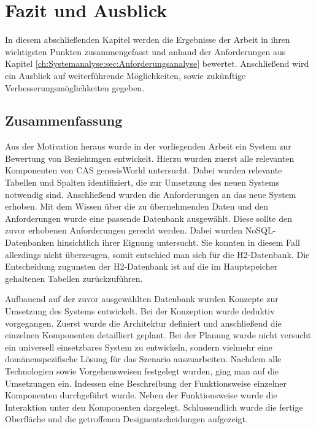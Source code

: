 
\chapter{Fazit und Ausblick}
\label{ch:Ergebnis}

In diesem abschließenden Kapitel werden die Ergebnisse der Arbeit in ihren wichtigsten Punkten zusammengefasst und anhand der Anforderungen aus Kapitel \ref{ch:Systemanalyse:sec:Anforderungsanalyse} bewertet. Anschließend wird ein Ausblick auf weiterführende Möglichkeiten, sowie zukünftige Verbesserungsmöglichkeiten gegeben. 

\section{Zusammenfassung}
\label{ch:Ergebnis:sec:zusammenfassung}

Aus der Motivation heraus wurde in der vorliegenden Arbeit ein System zur Bewertung von Beziehungen entwickelt. Hierzu wurden zuerst alle relevanten Komponenten von CAS genesisWorld untersucht. Dabei wurden relevante Tabellen und Spalten identifiziert, die zur Umsetzung des neuen Systems notwendig sind. Anschließend wurden die Anforderungen an das neue System erhoben. Mit dem Wissen über die zu übernehmenden Daten und den Anforderungen wurde eine passende Datenbank ausgewählt. Diese sollte den zuvor erhobenen Anforderungen gerecht werden. Dabei wurden NoSQL-Datenbanken hinsichtlich ihrer Eignung untersucht. Sie konnten in diesem Fall allerdings nicht überzeugen, somit entschied man sich für die H2-Datenbank. Die Entscheidung zugunsten der H2-Datenbank ist auf die im Hauptspeicher gehaltenen Tabellen zurückzuführen.   

Aufbauend auf der zuvor ausgewählten Datenbank wurden Konzepte zur Umsetzung des Systems entwickelt. Bei der Konzeption wurde deduktiv vorgegangen. Zuerst wurde die Architektur definiert und anschließend die einzelnen Komponenten detailliert geplant. Bei der Planung wurde nicht versucht ein universell einsetzbares System zu entwickeln, sondern vielmehr eine domänenspezifische Lösung für das Szenario auszuarbeiten. Nachdem alle Technologien sowie Vorgehensweisen festgelegt wurden, ging man auf die Umsetzungen ein. Indessen eine Beschreibung der Funktionsweise einzelner Komponenten durchgeführt wurde. Neben der Funktionsweise wurde die Interaktion unter den Komponenten dargelegt. Schlussendlich wurde die fertige Oberfläche und die getroffenen Designentscheidungen aufgezeigt.
 
